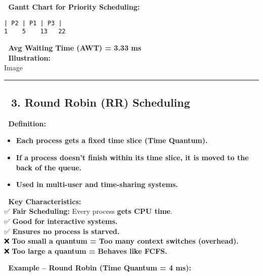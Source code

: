 \documentclass[
]{article}
\providecommand{\tightlist}{%
  \setlength{\itemsep}{0pt}\setlength{\parskip}{0pt}}
\begin{document}
📌 \textbf{Gantt Chart for Priority Scheduling:}

\begin{verbatim}
| P2 | P1 | P3 |
1    5    13   22
\end{verbatim}

📌 \textbf{Avg Waiting Time (AWT) = 3.33 ms}\\
📌 \textbf{Illustration:}\\
{Image}

\begin{center}\rule{0.5\linewidth}{0.5pt}\end{center}

\subsection{\texorpdfstring{\textbf{📌 3. Round Robin (RR)
Scheduling}}{📌 3. Round Robin (RR) Scheduling}}\label{round-robin-rr-scheduling}

📌 \textbf{Definition:}

\begin{itemize}
\tightlist
\item
  \textbf{Each process gets a fixed time slice (Time Quantum).}
\item
  \textbf{If a process doesn't finish within its time slice, it is moved
  to the back of the queue.}
\item
  \textbf{Used in multi-user and time-sharing systems.}
\end{itemize}

📌 \textbf{Key Characteristics:}\\
✅ \textbf{Fair Scheduling:} Every process \textbf{gets CPU time}.\\
✅ \textbf{Good for interactive systems.}\\
✅ \textbf{Ensures no process is starved.}\\
❌ \textbf{Too small a quantum = Too many context switches
(overhead).}\\
❌ \textbf{Too large a quantum = Behaves like FCFS.}

📌 \textbf{Example -- Round Robin (Time Quantum = 4 ms):}
\end{document}
